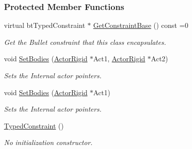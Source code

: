 \subsubsection*{Protected Member Functions}
\begin{DoxyCompactItemize}
\item 
virtual btTypedConstraint $\ast$ \hyperlink{classphys_1_1TypedConstraint_ab3bd2baa58d3f0d812401cbf59159a8b}{GetConstraintBase} () const =0
\begin{DoxyCompactList}\small\item\em Get the Bullet constraint that this class encapsulates. \item\end{DoxyCompactList}\item 
\hypertarget{classphys_1_1TypedConstraint_aa7cda1c6361cf777a8075e42e472a1c4}{
void \hyperlink{classphys_1_1TypedConstraint_aa7cda1c6361cf777a8075e42e472a1c4}{SetBodies} (\hyperlink{classphys_1_1ActorRigid}{ActorRigid} $\ast$Act1, \hyperlink{classphys_1_1ActorRigid}{ActorRigid} $\ast$Act2)}
\label{classphys_1_1TypedConstraint_aa7cda1c6361cf777a8075e42e472a1c4}

\begin{DoxyCompactList}\small\item\em Sets the Internal actor pointers. \item\end{DoxyCompactList}\item 
\hypertarget{classphys_1_1TypedConstraint_ab2a5d068aa0039054a57f57dd5297f61}{
void \hyperlink{classphys_1_1TypedConstraint_ab2a5d068aa0039054a57f57dd5297f61}{SetBodies} (\hyperlink{classphys_1_1ActorRigid}{ActorRigid} $\ast$Act1)}
\label{classphys_1_1TypedConstraint_ab2a5d068aa0039054a57f57dd5297f61}

\begin{DoxyCompactList}\small\item\em Sets the Internal actor pointers. \item\end{DoxyCompactList}\item 
\hyperlink{classphys_1_1TypedConstraint_a499e2f94ca4ee111001efa0dd3862391}{TypedConstraint} ()
\begin{DoxyCompactList}\small\item\em No initialization constructor. \item\end{DoxyCompactList}\end{DoxyCompactItemize}
